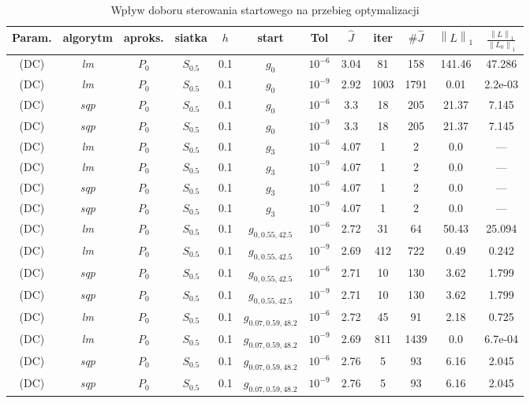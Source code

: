 \documentclass[licencjacka]{pracamgr}
\newcommand{\norm}[1]{\left\lVert#1\right\rVert}
\begin{document}
\begin{table}[h]
  \begin{center}
    \begin{tabular}{|c|c|c|c|c|c|c||c|c|c|c|c|}
      \hline
      Param. & algorytm & aproks. & siatka & $h$ & start & Tol & $\hat{J}$ & iter & $\#\hat{J}$ & $\norm{L}_1$ & $\frac{\norm{L}_1}{\norm{L_0}_1}$ \\
      \hline
      (DC) & {\it lm\/} & $P_0$ & $S_{0.5}$ & 0.1 & $g_0$ & $10^{-6}$ & 3.04 & 81 & 158 & 141.46 & 47.286 \\
      \hline
      (DC) & {\it lm\/} & $P_0$ & $S_{0.5}$ & 0.1 & $g_0$ & $10^{-9}$ & 2.92 & 1003 & 1791 & 0.01 & 2.2e-03 \\
      \hline
      (DC) & {\it sqp\/} & $P_0$ & $S_{0.5}$ & 0.1 & $g_0$ & $10^{-6}$ & 3.3 & 18 & 205 & 21.37 & 7.145 \\
      \hline
      (DC) & {\it sqp\/} & $P_0$ & $S_{0.5}$ & 0.1 & $g_0$ & $10^{-9}$ & 3.3 & 18 & 205 & 21.37 & 7.145 \\
      \hline
      (DC) & {\it lm\/} & $P_0$ & $S_{0.5}$ & 0.1 & $g_3$ & $10^{-6}$ & 4.07 & 1 & 2 & 0.0 & --- \\
      \hline
      (DC) & {\it lm\/} & $P_0$ & $S_{0.5}$ & 0.1 & $g_3$ & $10^{-9}$ & 4.07 & 1 & 2 & 0.0 & --- \\
      \hline
      (DC) & {\it sqp\/} & $P_0$ & $S_{0.5}$ & 0.1 & $g_3$ & $10^{-6}$ & 4.07 & 1 & 2 & 0.0 & --- \\
      \hline
      (DC) & {\it sqp\/} & $P_0$ & $S_{0.5}$ & 0.1 & $g_3$ & $10^{-9}$ & 4.07 & 1 & 2 & 0.0 & --- \\
      \hline
      (DC) & {\it lm\/} & $P_0$ & $S_{0.5}$ & 0.1 & $g_{0,0.55,42.5}$ & $10^{-6}$ & 2.72 & 31 & 64 & 50.43 & 25.094 \\
      \hline
      (DC) & {\it lm\/} & $P_0$ & $S_{0.5}$ & 0.1 & $g_{0,0.55,42.5}$ & $10^{-9}$ & 2.69 & 412 & 722 & 0.49 & 0.242 \\
      \hline
      (DC) & {\it sqp\/} & $P_0$ & $S_{0.5}$ & 0.1 & $g_{0,0.55,42.5}$ & $10^{-6}$ & 2.71 & 10 & 130 & 3.62 & 1.799 \\
      \hline
      (DC) & {\it sqp\/} & $P_0$ & $S_{0.5}$ & 0.1 & $g_{0,0.55,42.5}$ & $10^{-9}$ & 2.71 & 10 & 130 & 3.62 & 1.799 \\
      \hline
      (DC) & {\it lm\/} & $P_0$ & $S_{0.5}$ & 0.1 & $g_{0.07,0.59,48.2}$ & $10^{-6}$ & 2.72 & 45 & 91 & 2.18 & 0.725 \\
      \hline
      (DC) & {\it lm\/} & $P_0$ & $S_{0.5}$ & 0.1 & $g_{0.07,0.59,48.2}$ & $10^{-9}$ & 2.69 & 811 & 1439 & 0.0 & 6.7e-04 \\
      \hline
      (DC) & {\it sqp\/} & $P_0$ & $S_{0.5}$ & 0.1 & $g_{0.07,0.59,48.2}$ & $10^{-6}$ & 2.76 & 5 & 93 & 6.16 & 2.045 \\
      \hline
      (DC) & {\it sqp\/} & $P_0$ & $S_{0.5}$ & 0.1 & $g_{0.07,0.59,48.2}$ & $10^{-9}$ & 2.76 & 5 & 93 & 6.16 & 2.045 \\
      \hline
    \end{tabular}
    \caption{Wpływ doboru sterowania startowego na przebieg optymalizacji}\label{start_tbl}
  \end{center}
\end{table}
\end{document}
